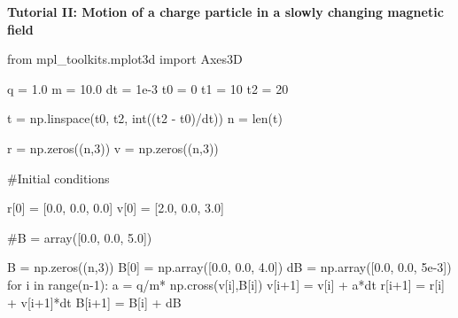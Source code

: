 \documentclass[
  letterpaper,
  DIV=11,
  numbers=noendperiod]{scrreprt}
\newenvironment{Shaded}{\begin{snugshade}}{\end{snugshade}}
\newcommand{\BuiltInTok}[1]{\textcolor[rgb]{0.00,0.23,0.31}{#1}}
\newcommand{\CommentTok}[1]{\textcolor[rgb]{0.37,0.37,0.37}{#1}}
\newcommand{\ControlFlowTok}[1]{\textcolor[rgb]{0.00,0.23,0.31}{#1}}
\newcommand{\DecValTok}[1]{\textcolor[rgb]{0.68,0.00,0.00}{#1}}
\newcommand{\FloatTok}[1]{\textcolor[rgb]{0.68,0.00,0.00}{#1}}
\newcommand{\ImportTok}[1]{\textcolor[rgb]{0.00,0.46,0.62}{#1}}
\newcommand{\KeywordTok}[1]{\textcolor[rgb]{0.00,0.23,0.31}{#1}}
\newcommand{\NormalTok}[1]{\textcolor[rgb]{0.00,0.23,0.31}{#1}}
\newcommand{\OperatorTok}[1]{\textcolor[rgb]{0.37,0.37,0.37}{#1}}
\begin{document}
\begin{tcolorbox}[enhanced jigsaw, toprule=.15mm, colframe=quarto-callout-color-frame, bottomrule=.15mm, leftrule=.75mm, left=2mm, breakable, rightrule=.15mm, arc=.35mm, opacityback=0, colback=white]

\vspace{-3mm}\textbf{Tutorial II: Motion of a charge particle in a slowly changing magnetic
field}\vspace{3mm}

\begin{Shaded}
\begin{Highlighting}[]
\ImportTok{from}\NormalTok{ mpl\_toolkits.mplot3d }\ImportTok{import}\NormalTok{ Axes3D}

\NormalTok{q }\OperatorTok{=} \FloatTok{1.0}
\NormalTok{m }\OperatorTok{=} \FloatTok{10.0}
\NormalTok{dt }\OperatorTok{=} \FloatTok{1e{-}3}
\NormalTok{t0 }\OperatorTok{=} \DecValTok{0}
\NormalTok{t1 }\OperatorTok{=} \DecValTok{10}
\NormalTok{t2 }\OperatorTok{=} \DecValTok{20}


\NormalTok{t }\OperatorTok{=}\NormalTok{ np.linspace(t0, t2, }\BuiltInTok{int}\NormalTok{((t2 }\OperatorTok{{-}}\NormalTok{ t0)}\OperatorTok{/}\NormalTok{dt))}
\NormalTok{n }\OperatorTok{=} \BuiltInTok{len}\NormalTok{(t)}

\NormalTok{r }\OperatorTok{=}\NormalTok{ np.zeros((n,}\DecValTok{3}\NormalTok{))}
\NormalTok{v }\OperatorTok{=}\NormalTok{ np.zeros((n,}\DecValTok{3}\NormalTok{))}

\CommentTok{\#Initial conditions}

\NormalTok{r[}\DecValTok{0}\NormalTok{] }\OperatorTok{=}\NormalTok{ [}\FloatTok{0.0}\NormalTok{, }\FloatTok{0.0}\NormalTok{, }\FloatTok{0.0}\NormalTok{]}
\NormalTok{v[}\DecValTok{0}\NormalTok{] }\OperatorTok{=}\NormalTok{ [}\FloatTok{2.0}\NormalTok{, }\FloatTok{0.0}\NormalTok{, }\FloatTok{3.0}\NormalTok{]}

\CommentTok{\#B = array([0.0, 0.0, 5.0])}

\NormalTok{B }\OperatorTok{=}\NormalTok{ np.zeros((n,}\DecValTok{3}\NormalTok{))}
\NormalTok{B[}\DecValTok{0}\NormalTok{] }\OperatorTok{=}\NormalTok{ np.array([}\FloatTok{0.0}\NormalTok{, }\FloatTok{0.0}\NormalTok{, }\FloatTok{4.0}\NormalTok{])}
\NormalTok{dB }\OperatorTok{=}\NormalTok{ np.array([}\FloatTok{0.0}\NormalTok{, }\FloatTok{0.0}\NormalTok{, }\FloatTok{5e{-}3}\NormalTok{])}
\ControlFlowTok{for}\NormalTok{ i }\KeywordTok{in} \BuiltInTok{range}\NormalTok{(n}\OperatorTok{{-}}\DecValTok{1}\NormalTok{):}
\NormalTok{    a   }\OperatorTok{=}\NormalTok{ q}\OperatorTok{/}\NormalTok{m}\OperatorTok{*}\NormalTok{ np.cross(v[i],B[i]) }
\NormalTok{    v[i}\OperatorTok{+}\DecValTok{1}\NormalTok{] }\OperatorTok{=}\NormalTok{ v[i] }\OperatorTok{+}\NormalTok{ a}\OperatorTok{*}\NormalTok{dt}
\NormalTok{    r[i}\OperatorTok{+}\DecValTok{1}\NormalTok{] }\OperatorTok{=}\NormalTok{ r[i] }\OperatorTok{+}\NormalTok{ v[i}\OperatorTok{+}\DecValTok{1}\NormalTok{]}\OperatorTok{*}\NormalTok{dt}
\NormalTok{    B[i}\OperatorTok{+}\DecValTok{1}\NormalTok{] }\OperatorTok{=}\NormalTok{ B[i] }\OperatorTok{+}\NormalTok{ dB}


\end{Highlighting}
\end{Shaded}
\end{tcolorbox}
\end{document}
